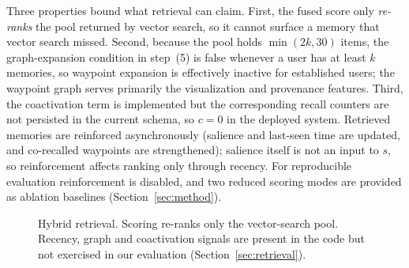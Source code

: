 \documentclass[conference]{IEEEtran}
\begin{document}
Three properties bound what retrieval can claim. First, the fused score only
\emph{re-ranks} the pool returned by vector search, so it cannot surface a memory
that vector search missed. Second, because the pool holds $\min(2k,30)$ items,
the graph-expansion condition in step~(5) is false whenever a user has at least
$k$ memories, so waypoint expansion is effectively inactive for established
users; the waypoint graph serves primarily the visualization and provenance
features. Third, the coactivation term is implemented but the corresponding
recall counters are not persisted in the current schema, so $c=0$ in the
deployed system. Retrieved memories are reinforced asynchronously (salience and
last-seen time are updated, and co-recalled waypoints are strengthened); salience
itself is not an input to $s$, so reinforcement affects ranking only through
recency. For reproducible evaluation reinforcement is disabled, and two reduced
scoring modes are provided as ablation baselines (Section~\ref{sec:method}).

\begin{figure}[t]
\centering
{}
\caption{Hybrid retrieval. Scoring re-ranks only the vector-search pool. Recency,
graph and coactivation signals are present in the code but not exercised in our
evaluation (Section~\ref{sec:retrieval}).}
\label{fig:retrieval}
\end{figure}
\end{document}
